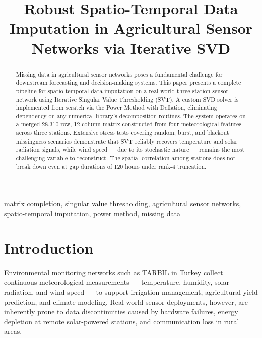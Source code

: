 \documentclass[conference]{IEEEtran}
\begin{document}
\title{Robust Spatio-Temporal Data Imputation in Agricultural Sensor Networks via Iterative SVD}

\author{
}

\maketitle

\begin{abstract}
Missing data in agricultural sensor networks poses a fundamental challenge for downstream forecasting and decision-making systems. This paper presents a complete pipeline for spatio-temporal data imputation on a real-world three-station sensor network using Iterative Singular Value Thresholding (SVT). A custom SVD solver is implemented from scratch via the Power Method with Deflation, eliminating dependency on any numerical library's decomposition routines. The system operates on a merged 28{,}310-row, 12-column matrix constructed from four meteorological features across three stations. Extensive stress tests covering random, burst, and blackout missingness scenarios demonstrate that SVT reliably recovers temperature and solar radiation signals, while wind speed — due to its stochastic nature — remains the most challenging variable to reconstruct. The spatial correlation among stations does not break down even at gap durations of 120 hours under rank-4 truncation.
\end{abstract}

\begin{IEEEkeywords}
matrix completion, singular value thresholding, agricultural sensor networks, spatio-temporal imputation, power method, missing data
\end{IEEEkeywords}

\section{Introduction}
\label{sec:intro}

Environmental monitoring networks such as TARBIL in Turkey collect continuous meteorological measurements — temperature, humidity, solar radiation, and wind speed — to support irrigation management, agricultural yield prediction, and climate modeling. Real-world sensor deployments, however, are inherently prone to data discontinuities caused by hardware failures, energy depletion at remote solar-powered stations, and communication loss in rural areas.
\end{document}
